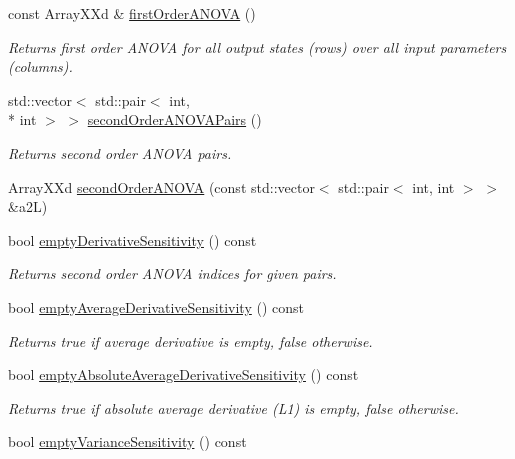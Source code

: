 \begin{DoxyCompactItemize}
const Array\-X\-Xd \& \hyperlink{class_go_s_u_m_1_1_c_sensitivity_analysis_a0ade75386c12f8a84a17b95643dc193b}{first\-Order\-A\-N\-O\-V\-A} ()
\begin{DoxyCompactList}\small\item\em Returns first order A\-N\-O\-V\-A for all output states (rows) over all input parameters (columns). \end{DoxyCompactList}\item 
std\-::vector$<$ std\-::pair$<$ int, \\*
int $>$ $>$ \hyperlink{class_go_s_u_m_1_1_c_sensitivity_analysis_ace8481cee588242e1a8db95f0c12a41f}{second\-Order\-A\-N\-O\-V\-A\-Pairs} ()
\begin{DoxyCompactList}\small\item\em Returns second order A\-N\-O\-V\-A pairs. \end{DoxyCompactList}\item 
Array\-X\-Xd \hyperlink{class_go_s_u_m_1_1_c_sensitivity_analysis_a8a22c4f7e4087ef427d546827a2601f4}{second\-Order\-A\-N\-O\-V\-A} (const std\-::vector$<$ std\-::pair$<$ int, int $>$ $>$ \&a2\-L)
\item 
bool \hyperlink{class_go_s_u_m_1_1_c_sensitivity_analysis_a8e7f2dc84832eeb676c3e3e59ef77a24}{empty\-Derivative\-Sensitivity} () const 
\begin{DoxyCompactList}\small\item\em Returns second order A\-N\-O\-V\-A indices for given pairs. \end{DoxyCompactList}\item 
bool \hyperlink{class_go_s_u_m_1_1_c_sensitivity_analysis_a4d8bf59473240b15c70af2c121645aea}{empty\-Average\-Derivative\-Sensitivity} () const 
\begin{DoxyCompactList}\small\item\em Returns true if average derivative is empty, false otherwise. \end{DoxyCompactList}\item 
bool \hyperlink{class_go_s_u_m_1_1_c_sensitivity_analysis_ae285a5614a6d3159458e35c50fea758f}{empty\-Absolute\-Average\-Derivative\-Sensitivity} () const 
\begin{DoxyCompactList}\small\item\em Returns true if absolute average derivative (L1) is empty, false otherwise. \end{DoxyCompactList}\item 
bool \hyperlink{class_go_s_u_m_1_1_c_sensitivity_analysis_af0b3073046472c00caaddd94f044e03f}{empty\-Variance\-Sensitivity} () const 

\end{DoxyCompactItemize}
